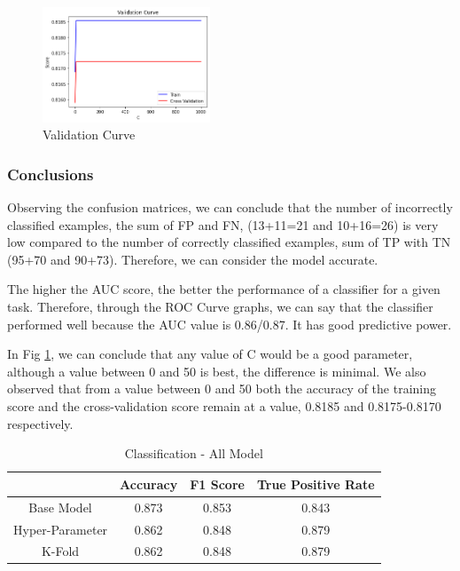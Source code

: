 \documentclass[conference]{IEEEtran}
\begin{document}
\begin{figure}[!h!]
    \centering
    \includegraphics[width=5cm]{LogReg/lg4.png}
    \caption{Validation Curve}
    \label{fig:validationCurveLogReg}
\end{figure}

\subsubsection{Conclusions}
Observing the confusion matrices, we can conclude that the number of incorrectly classified examples, the sum of FP and FN, (13+11=21 and 10+16=26) is very low compared to the number of correctly classified examples, sum of TP with TN (95+70 and 90+73). Therefore, we can consider the model accurate.

The higher the AUC score, the better the performance of a classifier for a given task. Therefore, through the ROC Curve graphs, we can say that the classifier performed well because the AUC value is 0.86/0.87. It has good predictive power.

In Fig \ref{fig:validationCurveLogReg}, we can conclude that any value of C would be a good parameter, although a value between 0 and 50 is best, the difference is minimal. We also observed that from a value between 0 and 50 both the accuracy of the training score and the cross-validation score remain at a value, 0.8185 and 0.8175-0.8170 respectively.

\begin{table}[ht!]
    \centering
    \caption{Classification - All Model} 
    \begin{tabular}{||c| c c c||} 
     \hline
     & Accuracy & F1 Score & True Positive Rate \\ [0.5ex] 
     \hline\hline
     Base Model &0.873 & 0.853 & 0.843 \\
     \hline
    Hyper-Parameter & 0.862 & 0.848 & 0.879 \\ 
    \hline
    K-Fold & 0.862 & 0.848 & 0.879 \\ 
    \hline
    \end{tabular}
    \label{tab:tab_LogReg}
\end{table}
\end{document}
